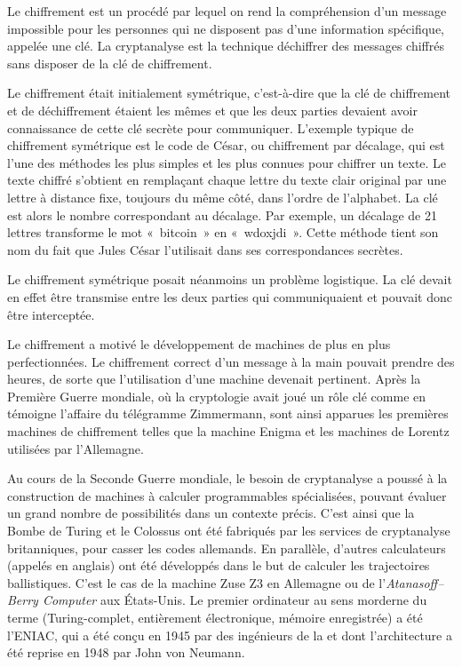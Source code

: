 Le chiffrement est un procédé par lequel on rend la compréhension d'un message impossible pour les personnes qui ne disposent pas d'une information spécifique, appelée une clé. La cryptanalyse est la technique déchiffrer des messages chiffrés sans disposer de la clé de chiffrement.

Le chiffrement était initialement symétrique, c'est-à-dire que la clé de chiffrement et de déchiffrement étaient les mêmes et que les deux parties devaient avoir connaissance de cette clé secrète pour communiquer. L'exemple typique de chiffrement symétrique est le code de César, ou chiffrement par décalage, qui est l'une des méthodes les plus simples et les plus connues pour chiffrer un texte. Le texte chiffré s'obtient en remplaçant chaque lettre du texte clair original par une lettre à distance fixe, toujours du même côté, dans l'ordre de l'alphabet. La clé est alors le nombre correspondant au décalage. Par exemple, un décalage de 21 lettres transforme le mot «~bitcoin~» en «~wdoxjdi~». Cette méthode tient son nom du fait que Jules César l'utilisait dans ses correspondances secrètes.

Le chiffrement symétrique posait néanmoins un problème logistique. La clé devait en effet être transmise entre les deux parties qui communiquaient et pouvait donc être interceptée. %

Le chiffrement a motivé le développement de machines de plus en plus perfectionnées. Le chiffrement correct d'un message à la main pouvait prendre des heures, de sorte que l'utilisation d'une machine devenait pertinent. Après la Première Guerre mondiale, où la cryptologie avait joué un rôle clé comme en témoigne l'affaire du télégramme Zimmermann, sont ainsi apparues les premières machines de chiffrement telles que la machine Enigma et les machines de Lorentz utilisées par l'Allemagne.

Au cours de la Seconde Guerre mondiale, le besoin de cryptanalyse a poussé à la construction de machines à calculer programmables spécialisées, pouvant évaluer un grand nombre de possibilités dans un contexte précis. C'est ainsi que la Bombe de Turing et le Colossus ont été fabriqués par les services de cryptanalyse britanniques, pour casser les codes allemands. En parallèle, d'autres calculateurs (appelés  en anglais) ont été développés dans le but de calculer les trajectoires ballistiques. C'est le cas de la machine Zuse Z3 en Allemagne ou de l'\emph{Atanasoff–Berry Computer} aux États-Unis. Le premier ordinateur au sens morderne du terme (Turing-complet, entièrement électronique, mémoire enregistrée) a été l'ENIAC, qui a été conçu en 1945 par des ingénieurs de la  et dont l'architecture a été reprise en 1948 par John von Neumann.

